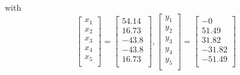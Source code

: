 \documentclass[11pt]{report}
\begin{document}
with
\[
    \begin{bmatrix}
    x_1 \\
    x_2 \\
    x_3 \\
    x_4 \\
    x_5 \\
    \end{bmatrix} 
    =
    \begin{bmatrix}
        54.14 \\
        16.73 \\
        -43.8 \\
        -43.8 \\
        16.73 \\
    \end{bmatrix},
        \begin{bmatrix}
    y_1 \\
    y_2 \\
    y_3 \\
    y_4 \\
    y_5 \\
    \end{bmatrix}  =
    \begin{bmatrix}
    -0 \\
    51.49 \\
    31.82 \\
    -31.82 \\
    -51.49 \\
    \end{bmatrix} 
\]
\end{document}
